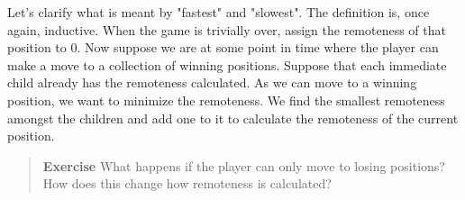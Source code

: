 \documentclass[a4paper]{article}
\begin{document}
Let's clarify what is meant by "fastest" and "slowest". The definition is, once again, inductive. When the game is trivially over, assign the remoteness of that position to $0$. Now suppose we are at some point in time where the player can make a move to a collection of winning positions. Suppose that each immediate child already has the remoteness calculated. As we can move to a winning position, we want to minimize the remoteness. We find the smallest remoteness amongst the children and add one to it to calculate the remoteness of the current position.

\begin{quote}
    \textbf{Exercise} What happens if the player can only move to losing positions? How does this change how remoteness is calculated?
\end{quote}
\end{document}
